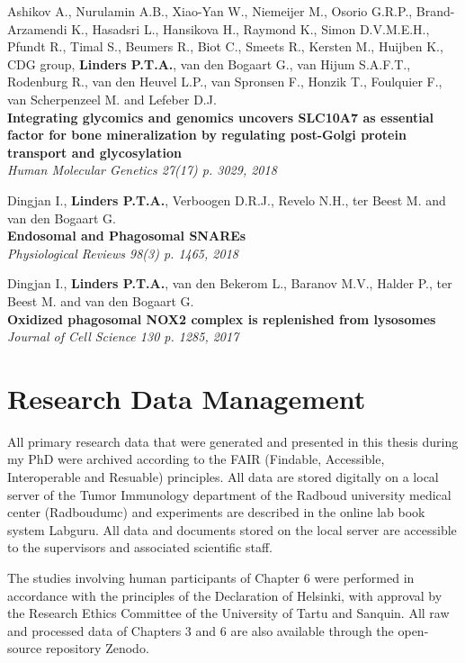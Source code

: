 \vspace{\baselineskip}

\noindent Ashikov A., Nurulamin A.B., Xiao-Yan W., Niemeijer M., Osorio G.R.P., Brand-Arzamendi K., Hasadsri L., Hansikova H., Raymond K., Simon D.V.M.E.H., Pfundt R., Timal S., Beumers R., Biot C., Smeets R., Kersten M., Huijben K., CDG group, \textbf{Linders P.T.A.}, van den Bogaart G., van Hijum S.A.F.T., Rodenburg R., van den Heuvel L.P., van Spronsen F., Honzik T., Foulquier F., van Scherpenzeel M. and Lefeber D.J. \\
\textbf{Integrating glycomics and genomics uncovers SLC10A7 as essential factor for bone mineralization by regulating post-Golgi protein transport and glycosylation} \\
\emph{Human Molecular Genetics 27(17) p. 3029, 2018}

\clearpage

\noindent Dingjan I., \textbf{Linders P.T.A.}, Verboogen D.R.J., Revelo N.H., ter Beest M. and van den Bogaart G. \\
\textbf{Endosomal and Phagosomal SNAREs} \\
\emph{Physiological Reviews 98(3) p. 1465, 2018}

\vspace{\baselineskip}

\noindent Dingjan I.,  \textbf{Linders P.T.A.}, van den Bekerom L., Baranov M.V., Halder P., ter Beest M. and van den Bogaart G. \\
\textbf{Oxidized phagosomal NOX2 complex is replenished from lysosomes} \\
\emph{Journal of Cell Science 130 p. 1285, 2017}

\cleartoleftpage

\section{Research Data Management}
All primary research data that were generated and presented in this thesis during my PhD were archived according to the FAIR (Findable, Accessible, Interoperable and Resuable) principles. All data are stored digitally on a local server of the Tumor Immunology department of the Radboud university medical center (Radboudumc) and experiments are described in the online lab book system Labguru. All data and documents stored on the local server are accessible to the supervisors and associated scientific staff.

The studies involving human participants of Chapter 6 were performed in accordance with the principles of the Declaration of Helsinki, with approval by the Research Ethics Committee of the University of Tartu and Sanquin. All raw and processed data of Chapters 3 and 6 are also available through the open-source repository Zenodo.

